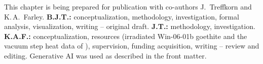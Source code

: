 \begin{chaptercredit}
This chapter is being prepared for publication with co-authors J.\ Treffkorn and K.\,A.\ Farley.
\textbf{B.J.T.:} conceptualization, methodology, investigation, formal analysis, visualization, writing -- original draft.
\textbf{J.T.:} methodology, investigation.
\textbf{K.A.F.:} conceptualization, resources (irradiated Win-06-01b goethite and the
vacuum step heat data of \citealt{farley2024}),
supervision, funding acquisition, writing -- review and editing.
Generative AI was used as described in the front matter.
\end{chaptercredit}
